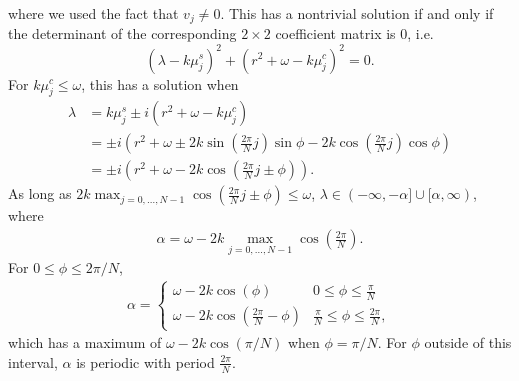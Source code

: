 \documentclass[11pt,reqno]{amsart}
\begin{document}
where we used the fact that $v_j \neq 0$. This has a nontrivial solution if and only if the determinant of the corresponding $2 \times 2$ coefficient matrix is 0, i.e.
\begin{equation*}
(\lambda - k \mu_j^s)^2  + (r^2 + \omega - k \mu_j^c)^2 = 0.
\end{equation*}
For $k \mu_j^c \leq \omega$, this has a solution when
\begin{align*}
\lambda &= k \mu_j^s  \pm i (r^2 + \omega - k \mu_j^c) \\
&= \pm i \left( r^2 + \omega \pm 2 k \sin\left( \frac{2 \pi}{N} j\right) \sin \phi 
- 2 k \cos\left( \frac{2 \pi}{N} j\right) \cos \phi
\right) \\
&= \pm i \left( r^2 + \omega - 2k \cos \left( \frac{2 \pi}{N} j \pm \phi \right) \right).
\end{align*}
As long as $2k \max_{j=0,\dots,N-1} \cos \left( \frac{2 \pi}{N} j \pm \phi \right) \leq \omega$, $\lambda \in (-\infty,-\alpha]\cup[\alpha, \infty)$, where
\begin{align}\label{eq:alpha1}
\alpha = \omega - 2k \max_{j=0,\dots,N-1} \cos \left( \frac{2 \pi}{N} \right).
\end{align}
For $0 \leq \phi \leq 2 \pi/N$, 
\begin{align*}
\alpha = \begin{cases}
\omega - 2 k \cos\left(\phi\right) & 0 \leq \phi \leq \frac{\pi}{N} \\
\omega - 2 k \cos\left(\frac{2\pi}{N}-\phi\right) & \frac{\pi}{N} \leq \phi \leq \frac{2\pi}{N},
\end{cases}
\end{align*}
which has a maximum of $\omega - 2 k \cos\left(\pi/N\right)$ when $\phi = \pi/N$. For $\phi$ outside of this interval, $\alpha$ is periodic with period $\frac{2\pi}{N}$. 



\end{document}
